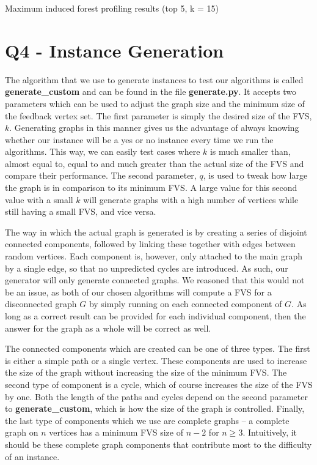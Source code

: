 \documentclass[a4paper,12pt]{article}
\begin{document}
Maximum induced forest profiling results (top 5, k = 15)

\section{Q4 - Instance Generation}

The algorithm that we use to generate instances to test our algorithms is called \textbf{generate\_custom} and can be found in the file \textbf{generate.py}. It accepts two parameters which can be used to adjust the graph size and the minimum size of the feedback vertex set. The first parameter is simply the desired size of the FVS, $k$. Generating graphs in this manner gives us the advantage of always knowing whether our instance will be a yes or no instance every time we run the algorithms. This way, we can easily test cases where $k$ is much smaller than, almost equal to, equal to and much greater than the actual size of the FVS and compare their performance. The second parameter, $q$, is used to tweak how large the graph is in comparison to its minimum FVS. A large value for this second value with a small $k$ will generate graphs with a high number of vertices while still having a small FVS, and vice versa.

The way in which the actual graph is generated is by creating a series of disjoint connected components, followed by linking these together with edges between random vertices. Each component is, however, only attached to the main graph by a single edge, so that no unpredicted cycles are introduced. As such, our generator will only generate connected graphs. We reasoned that this would not be an issue, as both of our chosen algorithms will compute a FVS for a disconnected graph $G$ by simply running on each connected component of $G$. As long as a correct result can be provided for each individual component, then the answer for the graph as a whole will be correct as well.

The connected components which are created can be one of three types. The first is either a simple path or a single vertex. These components are used to increase the size of the graph without increasing the size of the minimum FVS. The second type of component is a cycle, which of course increases the size of the FVS by one. Both the length of the paths and cycles depend on the second parameter to \textbf{generate\_custom}, which is how the size of the graph is controlled. Finally, the last type of components which we use are complete graphs -- a complete graph on $n$ vertices has a minimum FVS size of $n - 2$ for $n \geq 3$. Intuitively, it should be these complete graph components that contribute most to the difficulty of an instance.
\end{document}

